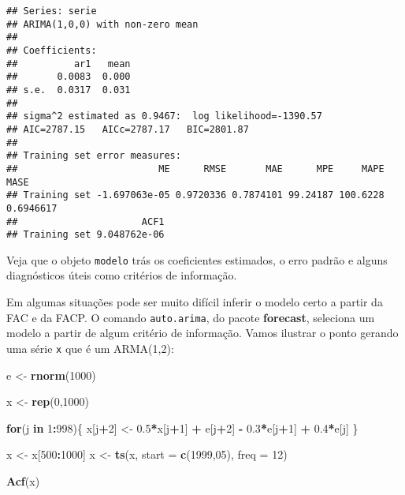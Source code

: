 \documentclass[]{book}
\newenvironment{Shaded}{\begin{snugshade}}{\end{snugshade}}
\newcommand{\KeywordTok}[1]{\textcolor[rgb]{0.13,0.29,0.53}{\textbf{#1}}}
\newcommand{\DataTypeTok}[1]{\textcolor[rgb]{0.13,0.29,0.53}{#1}}
\newcommand{\DecValTok}[1]{\textcolor[rgb]{0.00,0.00,0.81}{#1}}
\newcommand{\FloatTok}[1]{\textcolor[rgb]{0.00,0.00,0.81}{#1}}
\newcommand{\StringTok}[1]{\textcolor[rgb]{0.31,0.60,0.02}{#1}}
\newcommand{\ControlFlowTok}[1]{\textcolor[rgb]{0.13,0.29,0.53}{\textbf{#1}}}
\newcommand{\OperatorTok}[1]{\textcolor[rgb]{0.81,0.36,0.00}{\textbf{#1}}}
\newcommand{\NormalTok}[1]{#1}
\begin{document}
\begin{verbatim}
## Series: serie 
## ARIMA(1,0,0) with non-zero mean 
## 
## Coefficients:
##          ar1   mean
##       0.0083  0.000
## s.e.  0.0317  0.031
## 
## sigma^2 estimated as 0.9467:  log likelihood=-1390.57
## AIC=2787.15   AICc=2787.17   BIC=2801.87
## 
## Training set error measures:
##                         ME      RMSE       MAE      MPE     MAPE      MASE
## Training set -1.697063e-05 0.9720336 0.7874101 99.24187 100.6228 0.6946617
##                      ACF1
## Training set 9.048762e-06
\end{verbatim}

Veja que o objeto \texttt{modelo} trás os coeficientes estimados, o erro
padrão e alguns diagnósticos úteis como critérios de informação.

Em algumas situações pode ser muito difícil inferir o modelo certo a
partir da FAC e da FACP. O comando \texttt{auto.arima}, do pacote
\textbf{forecast}, seleciona um modelo a partir de algum critério de
informação. Vamos ilustrar o ponto gerando uma série \texttt{x} que é um
ARMA(1,2):

\begin{Shaded}
\begin{Highlighting}[]
\NormalTok{e <-}\StringTok{ }\KeywordTok{rnorm}\NormalTok{(}\DecValTok{1000}\NormalTok{)}

\NormalTok{x <-}\StringTok{ }\KeywordTok{rep}\NormalTok{(}\DecValTok{0}\NormalTok{,}\DecValTok{1000}\NormalTok{)}

\ControlFlowTok{for}\NormalTok{(j }\ControlFlowTok{in} \DecValTok{1}\OperatorTok{:}\DecValTok{998}\NormalTok{)\{}
\NormalTok{  x[j}\OperatorTok{+}\DecValTok{2}\NormalTok{] <-}\StringTok{ }\FloatTok{0.5}\OperatorTok{*}\NormalTok{x[j}\OperatorTok{+}\DecValTok{1}\NormalTok{] }\OperatorTok{+}\StringTok{ }\NormalTok{e[j}\OperatorTok{+}\DecValTok{2}\NormalTok{] }\OperatorTok{-}\StringTok{ }\FloatTok{0.3}\OperatorTok{*}\NormalTok{e[j}\OperatorTok{+}\DecValTok{1}\NormalTok{] }\OperatorTok{+}\StringTok{ }\FloatTok{0.4}\OperatorTok{*}\NormalTok{e[j]}
\NormalTok{\}}

\NormalTok{x <-}\StringTok{ }\NormalTok{x[}\DecValTok{500}\OperatorTok{:}\DecValTok{1000}\NormalTok{]}
\NormalTok{x <-}\StringTok{ }\KeywordTok{ts}\NormalTok{(x, }\DataTypeTok{start =} \KeywordTok{c}\NormalTok{(}\DecValTok{1999}\NormalTok{,}\DecValTok{05}\NormalTok{), }\DataTypeTok{freq =} \DecValTok{12}\NormalTok{)}

\KeywordTok{Acf}\NormalTok{(x)}
\end{Highlighting}
\end{Shaded}
\end{document}
